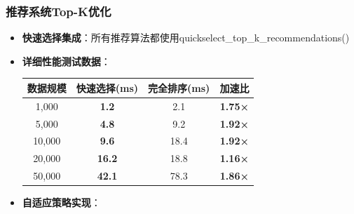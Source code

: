 \documentclass[12pt,a4paper]{article}
\begin{document}
\subsubsection{推荐系统Top-K优化}
\begin{itemize}
    \item \textbf{快速选择集成}：所有推荐算法都使用quickselect\_top\_k\_recommendations()
    \item \textbf{详细性能测试数据}：
    
    \begin{table}[H]
    \centering
    \begin{tcolorbox}[
        colback=light,
        colframe=primary,
        title={\textbf{Top-K推荐算法性能对比}},
        coltitle=white,
        colbacktitle=primary,
        fonttitle=\bfseries,
        rounded corners=5pt,
        width=0.85\textwidth
    ]
    \begin{tabular}{cccc}
    \toprule
    \rowcolor{secondary!20}
    \textbf{数据规模} & \textbf{快速选择(ms)} & \textbf{完全排序(ms)} & \textbf{加速比} \\
    \midrule
    1,000 & \textcolor{success}{\textbf{1.2}} & 2.1 & \textcolor{success}{\textbf{1.75×}} \\
    \rowcolor{light}
    5,000 & \textcolor{success}{\textbf{4.8}} & 9.2 & \textcolor{success}{\textbf{1.92×}} \\
    10,000 & \textcolor{success}{\textbf{9.6}} & 18.4 & \textcolor{success}{\textbf{1.92×}} \\
    \rowcolor{light}
    20,000 & \textcolor{success}{\textbf{16.2}} & 18.8 & \textcolor{warning}{\textbf{1.16×}} \\
    50,000 & \textcolor{success}{\textbf{42.1}} & 78.3 & \textcolor{success}{\textbf{1.86×}} \\
    \bottomrule
    \end{tabular}
    \end{tcolorbox}
    \end{table}
    \item \textbf{自适应策略实现}：
    

\end{itemize}
\end{document}
